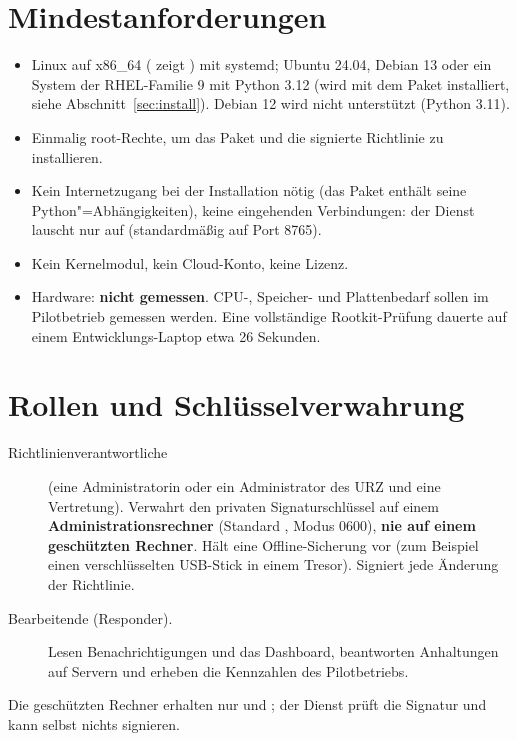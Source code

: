 \documentclass[11pt,a4paper]{article}
\begin{document}
\section{Mindestanforderungen}
\label{sec:req}
\begin{itemize}
  \item Linux auf x86\_64 ( zeigt ) mit systemd; Ubuntu 24.04,
    Debian 13 oder ein System der RHEL-Familie 9 mit Python 3.12 (wird mit dem Paket installiert,
    siehe Abschnitt~\ref{sec:install}). Debian 12 wird nicht unterstützt (Python 3.11).
  \item Einmalig root-Rechte, um das Paket und die signierte Richtlinie zu installieren.
  \item Kein Internetzugang bei der Installation nötig (das Paket enthält seine
    Python"=Abhängigkeiten), keine eingehenden Verbindungen: der Dienst lauscht nur
    auf  (standardmäßig auf Port 8765).
  \item Kein Kernelmodul, kein Cloud-Konto, keine Lizenz.
  \item Hardware: \textbf{nicht gemessen}. CPU-, Speicher- und Plattenbedarf sollen im
    Pilotbetrieb gemessen werden. Eine vollständige Rootkit-Prüfung dauerte auf einem
    Entwicklungs-Laptop etwa 26 Sekunden.
\end{itemize}

\section{Rollen und Schlüsselverwahrung}
\label{sec:roles}
\begin{description}
  \item[Richtlinienverantwortliche] (eine Administratorin oder ein Administrator des URZ und eine
    Vertretung). Verwahrt den privaten Signaturschlüssel  auf einem
    \textbf{Administrationsrechner} (Standard , Modus
    0600), \textbf{nie auf einem geschützten Rechner}. Hält eine Offline-Sicherung vor (zum
    Beispiel einen verschlüsselten USB-Stick in einem Tresor). Signiert jede Änderung der
    Richtlinie.
  \item[Bearbeitende (Responder).] Lesen Benachrichtigungen und das Dashboard, beantworten
    Anhaltungen auf Servern und erheben die Kennzahlen des Pilotbetriebs.
\end{description}
Die geschützten Rechner erhalten nur  und ; der Dienst prüft die
Signatur und kann selbst nichts signieren.
\end{document}
